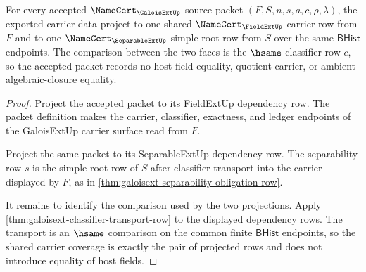 \begin{theorem}
\label{thm:galoisext-shared-carrier-coverage}
For every accepted $\NameCert_{\GaloisExtUp}$ source packet
$(F,S,n,s,a,c,\rho,\lambda)$, the exported carrier data project to one shared
$\NameCert_{\FieldExtUp}$ carrier row from $F$ and to one
$\NameCert_{\SeparableExtUp}$ simple-root row from $S$ over the same
$\mathsf{BHist}$ endpoints. The comparison between the two faces is the
$\hsame$ classifier row $c$, so the accepted packet records no host field
equality, quotient carrier, or ambient algebraic-closure equality.
\end{theorem}
\begin{proof}
Project the accepted packet to its FieldExtUp dependency row. The packet
definition makes the carrier, classifier, exactness, and ledger endpoints of
the GaloisExtUp carrier surface read from $F$.

Project the same packet to its SeparableExtUp dependency row. The separability
row $s$ is the simple-root row of $S$ after classifier transport into the
carrier displayed by $F$, as in
\autoref{thm:galoisext-separability-obligation-row}.

It remains to identify the comparison used by the two projections. Apply
\autoref{thm:galoisext-classifier-transport-row} to the displayed dependency
rows. The transport is an $\hsame$ comparison on the common finite
$\mathsf{BHist}$ endpoints, so the shared carrier coverage is exactly the pair
of projected rows and does not introduce equality of host fields.
\end{proof}

